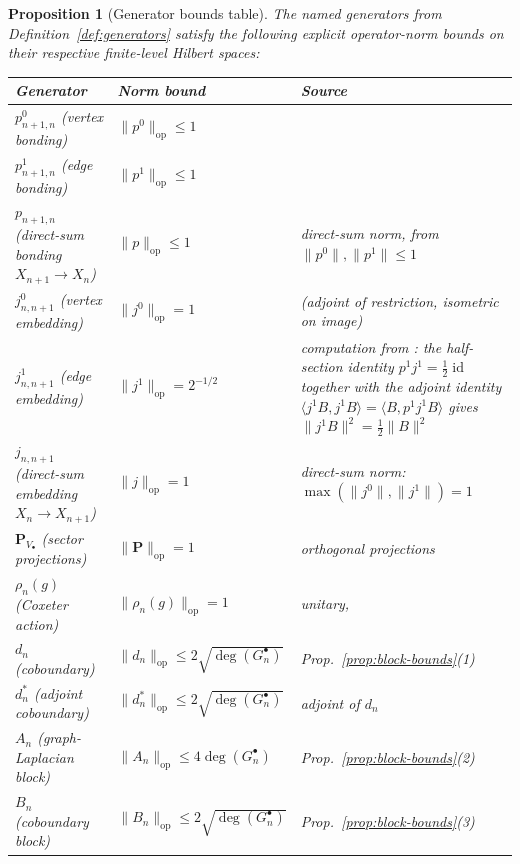 \documentclass[11pt, a4paper]{amsart}
\newtheorem{proposition}[theorem]{Proposition}
\theoremstyle{definition}
\newcommand{\id}{\operatorname{id}}
\newcommand{\op}{\operatorname{op}}
\begin{document}
\begin{proposition}[Generator bounds table]
\label{prop:generator-bounds}
The named generators from Definition~\ref{def:generators} satisfy
the following explicit operator-norm bounds on their respective
finite-level Hilbert spaces:
\begin{center}
\begin{tabular}{lll}
\hline
Generator & Norm bound & Source \\
\hline
$p_{n+1, n}^0$ (vertex bonding) & $\|p^0\|_{\op} \leq 1$ &
  \cite[Theorem~\texttt{thm:bonding}]{RefinementSpaces} \\
$p_{n+1, n}^1$ (edge bonding) & $\|p^1\|_{\op} \leq 1$ &
  \cite[Theorem~\texttt{thm:bonding}]{RefinementSpaces} \\
$p_{n+1, n}$ (direct-sum bonding $X_{n+1} \to X_n$) & $\|p\|_{\op}
  \leq 1$ & direct-sum norm, from $\|p^0\|, \|p^1\| \leq 1$ \\
$j_{n, n+1}^0$ (vertex embedding) & $\|j^0\|_{\op} = 1$ &
  \cite[Proposition~\texttt{prop:adjoints}]{RefinementSpaces} (adjoint of restriction,
  isometric on image) \\
$j_{n, n+1}^1$ (edge embedding) & $\|j^1\|_{\op} = 2^{-1/2}$ &
  computation from
  \cite[Proposition~\texttt{prop:adjoints}]{RefinementSpaces}: the
  half-section identity $p^1 j^1 = \tfrac{1}{2} \id$ together with
  the adjoint identity $\langle j^1 B, j^1 B \rangle =
  \langle B, p^1 j^1 B \rangle$ gives
  $\|j^1 B\|^2 = \tfrac{1}{2}\|B\|^2$ \\
$j_{n, n+1}$ (direct-sum embedding $X_n \to X_{n+1}$) & $\|j\|_{\op}
  = 1$ & direct-sum norm: $\max(\|j^0\|, \|j^1\|) = 1$ \\
$\mathbf{P}_{V_\bullet}$ (sector projections) & $\|\mathbf{P}\|_{\op}
  = 1$ & orthogonal projections \\
$\rho_n(g)$ (Coxeter action) & $\|\rho_n(g)\|_{\op} = 1$ & unitary,
  \cite[Lemma~\texttt{lem:coxeter-unitary}]{RefinementSpaces} \\
$d_n$ (coboundary) & $\|d_n\|_{\op} \leq 2\sqrt{\deg(G_n^\bullet)}$
  & Prop.~\ref{prop:block-bounds}(1) \\
$d_n^*$ (adjoint coboundary) & $\|d_n^*\|_{\op} \leq 2\sqrt{\deg(G_n
  ^\bullet)}$ & adjoint of $d_n$ \\
$A_n$ (graph-Laplacian block) & $\|A_n\|_{\op} \leq 4\deg(G_n
  ^\bullet)$ & Prop.~\ref{prop:block-bounds}(2) \\
$B_n$ (coboundary block) & $\|B_n\|_{\op} \leq 2\sqrt{\deg(G_n
  ^\bullet)}$ & Prop.~\ref{prop:block-bounds}(3) \\

\end{tabular}
\end{center}
\end{proposition}
\end{document}

